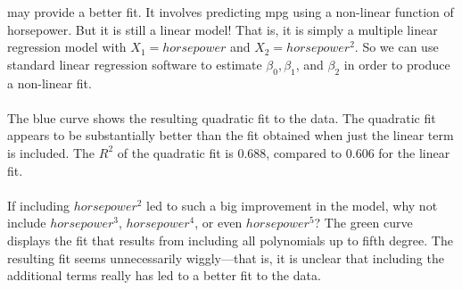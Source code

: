 may provide a better fit. It involves predicting mpg using a
non-linear function of horsepower. But it is still a linear model! That is, it is simply a multiple linear regression model with $X_1 = horsepower$ and $X_2 = horsepower^2$. So we can use standard linear regression software to estimate $\beta_0, \beta_1$, and $\beta_2$ in order to produce a non-linear fit.\\\\
The blue curve shows the resulting quadratic fit to the data. The quadratic fit appears to be substantially better than the fit obtained when just the linear term is included. The $R^2$ of the quadratic fit is 0.688, compared to 0.606 for the linear fit.\\\\
If including $horsepower^2$ led to such a big improvement in the model, why not include $horsepower^3$, $horsepower^4$, or even $horsepower^5$? The green curve displays the fit that results from including all polynomials up to fifth degree. The resulting fit seems unnecessarily wiggly—that is, it is unclear that including the additional terms really has led to a better fit to the data. 

